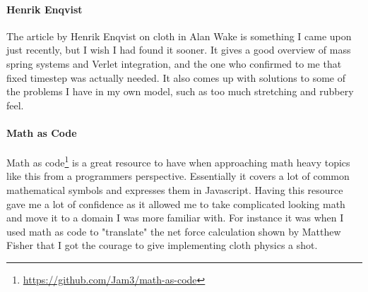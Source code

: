 \paragraph{Henrik Enqvist}
The article by Henrik Enqvist\cite{alan_wake_mass_spring} on cloth in Alan Wake is something I came upon just recently, but I wish I had found it sooner.
It gives a good overview of mass spring systems and Verlet integration, and the one who confirmed to me that fixed timestep was actually needed.
It also comes up with solutions to some of the problems I have in my own model, such as too much stretching and rubbery feel.

\paragraph{Math as Code}
Math as code\footnote{\url{https://github.com/Jam3/math-as-code}} is a great resource to have when approaching math heavy topics like this from a programmers perspective.
Essentially it covers a lot of common mathematical symbols and expresses them in Javascript. 
Having this resource gave me a lot of confidence as it allowed me to take complicated looking math and move it to a domain I was more familiar with.
For instance it was when I used math as code to "translate" the net force calculation shown by Matthew Fisher\cite{matthew_fisher} that I got the courage to give implementing cloth physics a shot.


